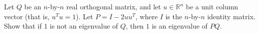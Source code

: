 Let $Q$ be an $n$-by-$n$ real orthogonal matrix, and let $u \in \mathbb{R}^n$ be a unit column vector (that is,
$u^T u = 1$). Let $P = I - 2uu^T$, where $I$ is the $n$-by-$n$ identity matrix. Show that if $1$ is not an eigenvalue of $Q$, then $1$ is an eigenvalue of $PQ$.
